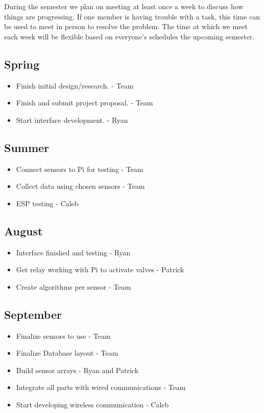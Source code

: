 \documentclass[letterpaper, 10 pt, conference]{ieeeconf}  %
\begin{document}
During the semester we plan on meeting at least once a week to discuss how things are progressing. If one member is having trouble with a task, this time can be used to meet in person to resolve the problem. The time at which we meet each week will be flexible based on everyone's schedules the upcoming semester.

\subsection{Spring}
\begin{itemize}
    \item Finish initial design/research. - Team
    \item Finish and submit project proposal. - Team
    \item Start interface development. - Ryan
\end{itemize}

\subsection{Summer}
\begin{itemize}
    \item Connect sensors to Pi for testing - Team
    \item Collect data using chosen sensors - Team
    \item ESP testing - Caleb
\end{itemize}

\subsection{August}
\begin{itemize}
    \item Interface finished and testing - Ryan
    \item Get relay working with Pi to activate valves - Patrick
    \item Create algorithms per sensor - Team
\end{itemize}

\subsection{September}
\begin{itemize}
    \item Finalize sensors to use - Team
    \item Finalize Database layout - Team
    \item Build sensor arrays - Ryan and Patrick
    \item Integrate all parts with wired communications - Team
    \item Start developing wireless communication - Caleb
\end{itemize}
\end{document}

